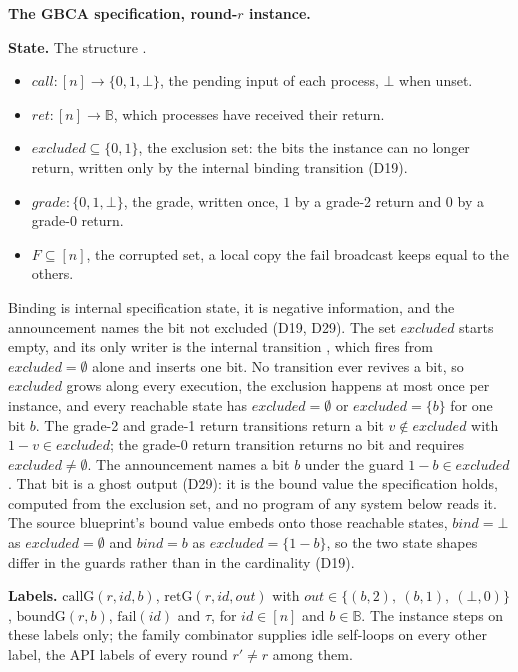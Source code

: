 \noindent\textbf{The GBCA specification, round-$r$ instance.}

\medskip
\noindent\textbf{State.} The structure .
\begin{itemize}
  \item $call : [n] \to \{0,1,\bot\}$, the pending input of each process, $\bot$ when unset.
  \item $ret : [n] \to \mathbb{B}$, which processes have received their return.
  \item $excluded \subseteq \{0,1\}$, the exclusion set: the bits the instance can no longer return, written only by the internal binding transition (D19).
  \item $grade : \{0,1,\bot\}$, the grade, written once, $1$ by a grade-2 return and $0$ by a grade-0 return.
  \item $F \subseteq [n]$, the corrupted set, a local copy the $\mathrm{fail}$ broadcast keeps equal to the others.
\end{itemize}
\noindent Binding is internal specification state, it is negative information, and the announcement names the bit not excluded (D19, D29).
The set $excluded$ starts empty, and its only writer is the internal transition , which fires from $excluded = \emptyset$ alone and inserts one bit.
No transition ever revives a bit, so $excluded$ grows along every execution, the exclusion happens at most once per instance, and every reachable state has $excluded = \emptyset$ or $excluded = \{b\}$ for one bit $b$.
The grade-2 and grade-1 return transitions return a bit $v \notin excluded$ with $1 - v \in excluded$; the grade-0 return transition returns no bit and requires $excluded \neq \emptyset$.
The announcement names a bit $b$ under the guard $1-b \in excluded$.
That bit is a ghost output (D29): it is the bound value the specification holds, computed from the exclusion set, and no program of any system below reads it.
The source blueprint's bound value embeds onto those reachable states, $bind = \bot$ as $excluded = \emptyset$ and $bind = b$ as $excluded = \{1-b\}$, so the two state shapes differ in the guards rather than in the cardinality (D19).

\noindent\textbf{Labels.}
$\mathrm{callG}(r,id,b)$, $\mathrm{retG}(r,id,out)$ with $out \in \{(b,2),\ (b,1),\ (\bot,0)\}$, $\mathrm{boundG}(r,b)$, $\mathrm{fail}(id)$ and $\tau$, for $id \in [n]$ and $b \in \mathbb{B}$.
The instance steps on these labels only; the family combinator supplies idle self-loops on every other label, the API labels of every round $r' \neq r$ among them.

